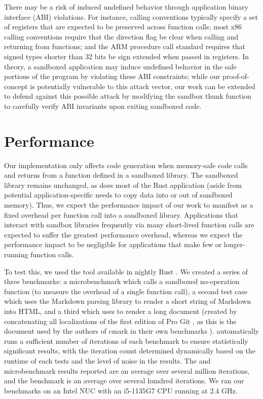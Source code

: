 There may be a risk of induced undefined behavior through application binary interface (ABI)
violations. For instance, calling conventions typically specify a set of registers that are expected
to be preserved across function calls; most x86 calling conventions require that the direction flag
be clear when calling and returning from functions; and the ARM procedure call standard requires
that signed types shorter than 32 bits be sign extended when passed in registers. In theory, a
sandboxed application may induce undefined behavior in the safe portions of the program by violating
these ABI constraints; while our proof-of-concept is potentially vulnerable to this attack vector,
our work can be extended to defend against this possible attack by modifying the sandbox thunk
function to carefully verify ABI invariants upon exiting sandboxed code.

\section{Performance}

Our implementation only affects code generation when memory-safe code calls and returns from a
function defined in a sandboxed library. The sandboxed library remains unchanged, as does most of
the Rust application (aside from potential application-specific needs to copy data into or out of
sandboxed memory). Thus, we expect the performance impact of our work to manifest as a fixed
overhead per function call into a sandboxed library. Applications that interact with sandbox
libraries frequently via many short-lived function calls are expected to suffer the greatest
performance overhead, whereas we expect the performance impact to be negligible for applications
that make few or longer-running function calls.

To test this, we used the  tool available in nightly Rust \cite{rust:cargo-bench}.
We created a series of three benchmarks: a microbenchmark which calls a sandboxed no-operation
function (to measure the overhead of a single function call), a second test case which uses the
 Markdown parsing library \cite{cmark} to render a short string of Markdown into HTML, and
a third which uses  to render a long document (created by concatenating all localizations
of the first edition of Pro Git \cite{pro-git}, as this is the document used by the authors of cmark
in their own benchmarks \cite{cmark:benchmarks}).  automatically runs a sufficient
number of iterations of each benchmark to ensure statistically significant results, with the
iteration count determined dynamically based on the runtime of each tests and the level of noise in
the results. The  and  microbenchmark results reported are an average over
several million iterations, and the  benchmark is an average over several hundred
iterations. We ran our benchmarks on an Intel NUC with an i5-1135G7 CPU running at 2.4 GHz.


